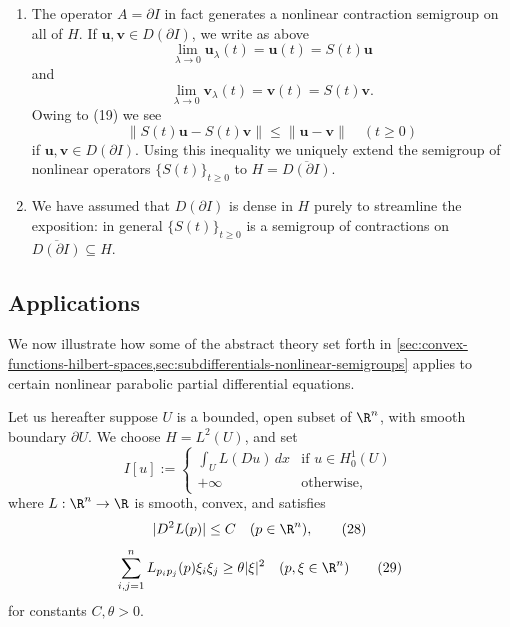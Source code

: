 \begin{remark}
\label{rem:gradient-flow-semigroup-extension}
\begin{enumerate}
\item[(i)] The operator $A = \partial I$ in fact generates a nonlinear contraction semigroup on all of $H$. If $\mathbf{u}, \mathbf{v} \in D(\partial I)$, we write as above
\[
\lim_{\lambda \to 0} \mathbf{u}_\lambda(t) = \mathbf{u}(t) = S(t)\mathbf{u}
\]
and
\[
\lim_{\lambda \to 0} \mathbf{v}_\lambda(t) = \mathbf{v}(t) = S(t)\mathbf{v}.
\]
Owing to (19) we see
\[
\|S(t)\mathbf{u} - S(t)\mathbf{v}\| \leq \|\mathbf{u} - \mathbf{v}\| \quad (t \geq 0)
\]
if $\mathbf{u}, \mathbf{v} \in D(\partial I)$. Using this inequality we uniquely extend the semigroup of nonlinear operators $\{S(t)\}_{t \geq 0}$ to $H = \overline{D(\partial I)}$.
\item[(ii)] We have assumed that $D(\partial I)$ is dense in $H$ purely to streamline the exposition: in general $\{S(t)\}_{t \geq 0}$ is a semigroup of contractions on $\overline{D(\partial I)} \subseteq H$.
\end{enumerate}
\end{remark}

\subsection{Applications}
\label{sec:gradient-flow-applications}

We now illustrate how some of the abstract theory set forth in \cref{sec:convex-functions-hilbert-spaces,sec:subdifferentials-nonlinear-semigroups} applies to certain nonlinear parabolic partial differential equations.

Let us hereafter suppose $U$ is a bounded, open subset of $\R^n$, with smooth boundary $\partial U$. We choose $H = L^2(U)$, and set
\[
I[u] := \begin{cases} \int_U L(Du) \, dx & \text{if } u \in H_0^1(U) \\ +\infty & \text{otherwise,} \end{cases}
\tag{27}
\]
where $L : \R^n \to \R$ is smooth, convex, and satisfies
\[
|D^2L(p)| \leq C \quad (p \in \R^n),
\tag{28}
\]
\[
\sum_{i,j=1}^n L_{p_ip_j}(p)\xi_i\xi_j \geq \theta|\xi|^2 \quad (p,\xi \in \R^n)
\tag{29}
\]
for constants $C, \theta > 0$.

